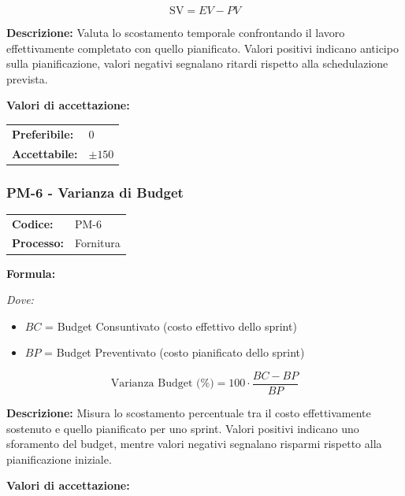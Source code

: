 \documentclass[a4paper,11pt,oneside]{scrartcl}
\begin{document}
\[
\text{SV} = EV - PV
\]

\noindent\textbf{Descrizione:} Valuta lo scostamento temporale confrontando il lavoro effettivamente completato con quello pianificato. Valori positivi indicano anticipo sulla pianificazione, valori negativi segnalano ritardi rispetto alla schedulazione prevista.

\vspace{0.2cm}
\noindent\textbf{Valori di accettazione:}
\vspace{0.1cm}

\noindent
\begin{tabular}{@{}ll@{}}
\textbf{Preferibile:} & $0$ \\
\textbf{Accettabile:} & $\pm 150$ \\
\end{tabular}

\subsubsection{PM-6 - Varianza di Budget}

\noindent
\begin{tabular}{@{}p{}p{}@{}}
\textbf{Codice:} & PM-6 \\
\textbf{Processo:} & Fornitura \\
\end{tabular}

\vspace{0.3cm}
\noindent\textbf{Formula:}

\noindent\textit{Dove:}
\begin{itemize}[leftmargin=1.5cm, topsep=0pt, itemsep=0pt]
    \item $BC$ = Budget Consuntivato (costo effettivo dello sprint)
    \item $BP$ = Budget Preventivato (costo pianificato dello sprint)
\end{itemize}

\[
\text{Varianza Budget (\%)} = 100 \cdot \frac{BC - BP}{BP}
\]

\noindent\textbf{Descrizione:} Misura lo scostamento percentuale tra il costo effettivamente sostenuto e quello pianificato per uno sprint. Valori positivi indicano uno sforamento del budget, mentre valori negativi segnalano risparmi rispetto alla pianificazione iniziale.

\vspace{0.2cm}
\noindent\textbf{Valori di accettazione:}
\vspace{0.1cm}
\end{document}
